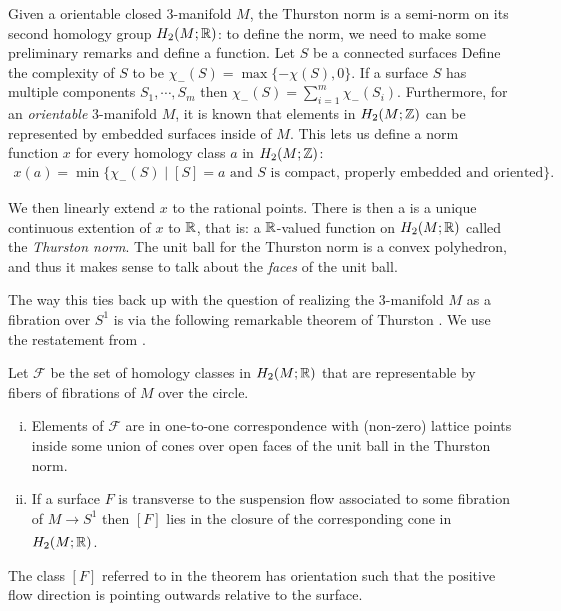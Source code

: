 Given a orientable closed $3$-manifold $M$, the Thurston norm is a semi-norm on its second homology
group $H_2(M; \mathbb{R})$: to define the norm, we need to make some preliminary remarks and define a
function.  Let $S$ be a connected surfaces  Define the complexity of $S$ to be $\chi_-(S) = \max\{-\chi(S),0\}$. If a
surface $S$ has multiple components $S_1,\cdots,S_m$ then $\chi_-(S)=\displaystyle\sum_{i=1}^m\chi_-(S_i)$.  Furthermore, for an \emph{orientable} 3-manifold $M$, it is known that
elements in $H_2(M ; \mathbb{Z})$ can be represented by embedded surfaces inside of $M$. This lets us
define a norm function $x$ for every homology class $a$ in $H_2(M; \mathbb{Z})$:
\begin{align*}
  x(a) = \min\{\chi_-(S) \mid [S] = a \text{ and $S$ is compact, properly embedded and oriented}\}.
\end{align*}

We then linearly extend $x$ to the rational points.  There is then a is a unique continuous extention of $x$ to $\mathbb{R}$, that is: a $\mathbb{R}$-valued function on $H_2(M; \mathbb{R})$ called the {\it Thurston norm}. The unit ball for the Thurston norm is a convex polyhedron, and thus it makes
sense to talk about the \emph{faces} of the unit ball.

The way this ties back up with the question of realizing the $3$-manifold $M$ as a fibration over
$S^1$ is via the following remarkable theorem of Thurston \cite{thurston1986norm}.  We use the restatement from \cite{yazdi2018pseudo}.

\begin{thm}[Thurston]
  \label{thm:Thur1}
  Let $\mathcal{F}$ be the set of homology classes in $H_2(M; \mathbb{R})$ that are representable by fibers of
  fibrations of $M$ over the circle.
\begin{enumerate}[(i)]
\item Elements of $\mathcal{F}$ are in one-to-one correspondence with (non-zero) lattice points
  inside some union of cones over open faces of the unit ball in the Thurston norm.
\item If a surface $F$ is transverse to the suspension flow associated to some fibration of
  $M \xrightarrow[]{} S^1$ then $[F]$ lies in the closure of the corresponding cone in $H_2(M;\mathbb{R})$.
\end{enumerate}
\end{thm}
The class $[F]$ referred to in the theorem has orientation such that the positive flow direction is pointing outwards relative to the surface.

